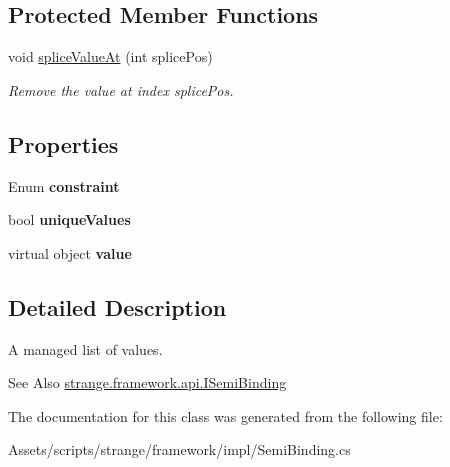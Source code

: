 \subsection*{Protected Member Functions}
\begin{DoxyCompactItemize}
\item 
\hypertarget{classstrange_1_1framework_1_1impl_1_1_semi_binding_a15a785ae9b34142bc49d0d6e8a04209a}{void \hyperlink{classstrange_1_1framework_1_1impl_1_1_semi_binding_a15a785ae9b34142bc49d0d6e8a04209a}{splice\-Value\-At} (int splice\-Pos)}\label{classstrange_1_1framework_1_1impl_1_1_semi_binding_a15a785ae9b34142bc49d0d6e8a04209a}

\begin{DoxyCompactList}\small\item\em Remove the value at index splice\-Pos. \end{DoxyCompactList}\end{DoxyCompactItemize}
\subsection*{Properties}
\begin{DoxyCompactItemize}
\item 
\hypertarget{classstrange_1_1framework_1_1impl_1_1_semi_binding_a0150494df4cb803713de14cc67383ca9}{Enum {\bfseries constraint}}\label{classstrange_1_1framework_1_1impl_1_1_semi_binding_a0150494df4cb803713de14cc67383ca9}

\item 
\hypertarget{classstrange_1_1framework_1_1impl_1_1_semi_binding_ab5115c4a789d11a90acf7c70e7146c4d}{bool {\bfseries unique\-Values}}\label{classstrange_1_1framework_1_1impl_1_1_semi_binding_ab5115c4a789d11a90acf7c70e7146c4d}

\item 
\hypertarget{classstrange_1_1framework_1_1impl_1_1_semi_binding_aae37109bd7acfcf56ecc95f0172a8b6a}{virtual object {\bfseries value}}\label{classstrange_1_1framework_1_1impl_1_1_semi_binding_aae37109bd7acfcf56ecc95f0172a8b6a}

\end{DoxyCompactItemize}


\subsection{Detailed Description}
A managed list of values. 

\begin{DoxySeeAlso}{See Also}
\hyperlink{interfacestrange_1_1framework_1_1api_1_1_i_semi_binding}{strange.\-framework.\-api.\-I\-Semi\-Binding} 
\end{DoxySeeAlso}


The documentation for this class was generated from the following file\-:\begin{DoxyCompactItemize}
\item 
Assets/scripts/strange/framework/impl/Semi\-Binding.\-cs\end{DoxyCompactItemize}
